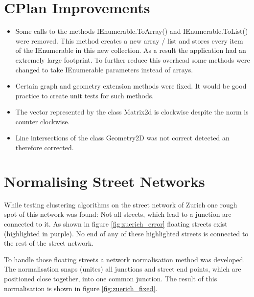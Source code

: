 \pagebreak
\section{CPlan Improvements}
\begin{itemize}
    \item Some calls to the methods IEnumerable.ToArray() and IEnumerable.ToList() were removed. This method creates a new array / list and stores every item of the IEnumerable in this new collection. As a result the application had an extremely large footprint. To further reduce this overhead some methods were changed to take IEnumerable parameters instead of arrays.
    \item Certain graph and geometry extension methods were fixed. It would be good practice to create unit tests for such methods.
    \item The vector represented by the class Matrix2d is clockwise despite the norm is counter clockwise.
    \item Line intersections of the class Geometry2D was not correct detected an therefore corrected. 
\end{itemize}

\pagebreak
\section{Normalising Street Networks}
While testing clustering algorithms on the street network of Zurich one rough spot of this network was found: Not all streets, which lead to a junction are connected to it. As shown in figure \ref{fig:zuerich_error} floating streets exist (highlighted in purple). No end of any of these highlighted streets is connected to the rest of the street network.

To handle those floating streets a network normalisation method was developed. The normalisation snaps (unites) all junctions and street end points, which are positioned close together, into one common junction. The result of this normalisation is shown in figure \ref{fig:zuerich_fixed}.

